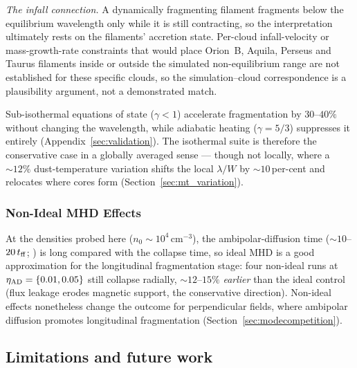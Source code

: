 \documentclass[usenatbib,twoside,twocolumn]{mnras}
\begin{document}
\emph{The infall connection.} A dynamically fragmenting filament fragments below the equilibrium wavelength only while it is still contracting, so the interpretation ultimately rests on the filaments' accretion state. Per-cloud infall-velocity or mass-growth-rate constraints that would place Orion~B, Aquila, Perseus and Taurus filaments inside or outside the simulated non-equilibrium range are not established for these specific clouds, so the simulation--cloud correspondence is a plausibility argument, not a demonstrated match.

Sub-isothermal equations of state ($\gamma<1$) accelerate fragmentation by $30$--$40\%$ without changing the wavelength, while adiabatic heating ($\gamma=5/3$) suppresses it entirely (Appendix~\ref{sec:validation}). The isothermal suite is therefore the conservative case in a globally averaged sense --- though not locally, where a $\sim12\%$ dust-temperature variation shifts the local $\lambda/W$ by $\sim10$\,per-cent and relocates where cores form (Section~\ref{sec:mt_variation}).

\subsubsection{Non-Ideal MHD Effects}
\label{sec:nonideal}

At the densities probed here ($n_0\sim10^4$\,cm$^{-3}$), the ambipolar-diffusion time ($\sim10$--$20\,t_{\rm ff}$; \citealt{Tassis2004}) is long compared with the collapse time, so ideal MHD is a good approximation for the longitudinal fragmentation stage: four non-ideal runs at $\eta_{\rm AD}=\{0.01,0.05\}$ still collapse radially, $\sim12$--$15\%$ \textit{earlier} than the ideal control (flux leakage erodes magnetic support, the conservative direction). Non-ideal effects nonetheless change the outcome for perpendicular fields, where ambipolar diffusion promotes longitudinal fragmentation (Section~\ref{sec:modecompetition}).

\subsection{Limitations and future work}
\label{sec:limitations}
\end{document}
